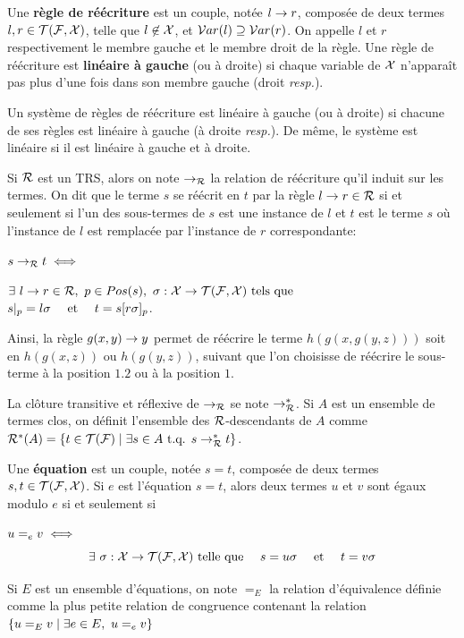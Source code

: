 \begin{definition}
  Une \textbf{règle de réécriture} est un couple, notée $l \rightarrow r$, composée de deux termes $l, r \in \mathcal{T(F, X)}$,
  telle que $l \not \in \mathcal X$, et $\mathcal{ V}ar(l) \supseteq \mathcal{ V}ar(r)$. 
  On appelle $l$ et $r$ respectivement le membre gauche et le membre droit de la règle.
  Une règle de réécriture est \textbf{linéaire à gauche} (ou à droite) si chaque variable de $\mathcal X$ 
  n'apparaît pas plus d'une fois dans son membre gauche (droit \textit{resp.}).
\end{definition}

Un système de règles de réécriture est linéaire à gauche (ou à droite) si chacune 
de ses règles est linéaire à gauche (à droite \textit{resp.}). De même, le système est 
linéaire si il est linéaire à gauche et à droite.

\begin{definition}
  Si $\mathcal R$ est un TRS, alors on note $\rightarrow_{\mathcal R}$ la relation de réécriture qu'il induit sur les termes.
  On dit que le terme $s$ se réécrit en $t$ par la règle $l \rightarrow r \in \mathcal R$ si et seulement si l'un des sous-termes de $s$
  est une instance de $l$ et $t$ est le terme $s$ où l'instance de $l$ est remplacée par l'instance de $r$ correspondante:

  \noindent $s \rightarrow_\mathcal R t \; \Longleftrightarrow \;$
  \begin{flushright}
    $\exists\ l \rw r \in \R,\ p \in Pos(s),\ \sigma: \X \rw \TFX \textrm{ tels que }\quad \quad \quad$
    $s|_p = l\sigma \quad \mbox{ et } \quad  t = s[r\sigma]_p$.
  \end{flushright}
\end{definition}
Ainsi, la règle $g(x, y) \rightarrow y$ permet de réécrire le terme $h(g(x, g(y, z)))$ 
soit en $h(g(x, z))$ ou $h(g(y, z))$, suivant que l'on choisisse de réécrire le sous-terme
à la position $1.2$ ou à la position $1$.

La clôture transitive et réflexive de $\rightarrow_\mathcal R$ se note $\rightarrow^*_{\mathcal R}$.
Si $A$ est un ensemble de termes clos, on définit l'ensemble des $\mathcal R$-descendants 
de $A$ comme $\mathcal R^*(A) = \{t \in \mathcal{T(F)} \; | \; \exists s \in A \mbox{ t.q. } s \rightarrow^*_{\mathcal R} t \}$.

\begin{definition}
  Une \textbf{équation} est un couple, notée $s = t$, composée de deux termes $s, t \in \mathcal{T(F, X)}$.
  Si $e$ est l'équation $s = t$, alors deux termes $u$ et $v$ sont égaux modulo $e$ si et seulement si
  
  \noindent $u =_e v \; \Longleftrightarrow \;$\\
  \[\exists\ \sigma: \mathcal X \rightarrow \mathcal{T(F, X)} \textrm{ telle que } \quad s = u\sigma \quad \mbox{ et } \quad  t = v\sigma\]
  
  Si $E$ est un ensemble d'équations, on note $=_E$ la relation d'équivalence définie comme la plus petite relation
  de congruence contenant la relation $\{ u =_E v \; | \; \exists e \in E,\ u =_e v\}$
\end{definition}


